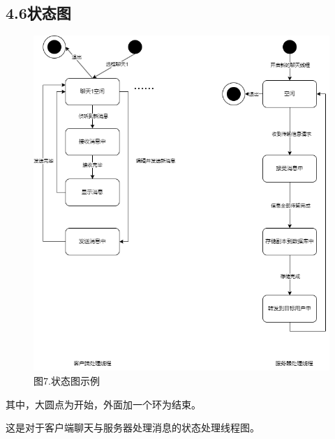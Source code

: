 \documentclass[24pt,a4paper]{article}%
\begin{document}
\subsection*{\songti 4.6状态图}
\begin{figure}[H]
    \centering
    \includegraphics[width=1\textwidth]{images/state.png}
    \caption*{图7.状态图示例}
\end{figure}
其中，大圆点为开始，外面加一个环为结束。\par
这是对于客户端聊天与服务器处理消息的状态处理线程图。\par
\end{document}
